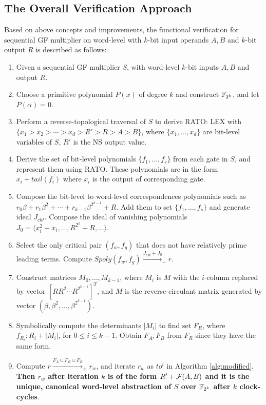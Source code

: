\subsection{The Overall Verification Approach}
Based on above concepts and improvements, the functional verification for sequential GF multiplier 
on word-level with $k$-bit input operands $A,B$ and $k$-bit output $R$ is described as follows:
\begin{enumerate}[{1)}]
\item Given a sequential GF multiplier $S$, with word-level $k$-bit inputs $A,B$ and output $R$.
\item Choose a primitive polynomial $P(x)$ of degree $k$ and construct ${\mathbb{F}}_{2^k}$, and let $P(\alpha)=0$.
\item Perform a reverse-topological traversal of $S$ to derive RATO: LEX with $\{x_1>x_2>\cdots>x_d>R'>R>A>B\}$,
where $\{x_1,\dots,x_d\}$ are bit-level variables of $S$, $R'$ is the NS output value.
\item Derive the set of bit-level polynomials $\{f_1,\dots,f_s\}$ from each gate in $S$, and represent them 
using RATO. These polynomials are in the form $x_i+tail(f_i)$ where $x_i$ is the output of corresponding gate.
\item Compose the bit-level to word-level correspondences polynomials such as $r_0\beta+r_1\beta^2+\cdots+r_{k-1}\beta^{2^{k-1}}+R$.
Add them to set $\{f_1,\dots,f_s\}$ and generate ideal $J_{ckt}$. Compose the ideal of vanishing polynomials
$J_0 = \langle x_i^2+x_i, \dots, R^{2^k}+R,\dots\rangle$.
\item Select the only critical pair $(f_w,f_g)$ that does not have relatively prime leading terms. Compute
$Spoly(f_w,f_g) \xrightarrow{J_{ckt}+J_0}_{+}r$.
\item Construct matrices $M_0,\dots,M_{k-1}$, where $M_i$ is $M$ with the $i$-column replaced by vector 
$[R R^2 \cdots R^{2^{k-1}}]^T$, and $M$ is the reverse-circulant matrix generated by vector $(\beta,\beta^2,\dots,\beta^{2^{k-1}})$.
\item Symbolically compute the determinants $|M_i|$ to find set $F_R$, where $f_{R_i}:R_i+|M_i|$, for $0\leq i \leq k-1$.
Obtain $F_A, F_B$ from $F_R$ since they have the same form.
\item Compute $r \xrightarrow{F_A\cup F_B \cup F_R}_{+}r_w$, and iterate $r_w$ as $to^i$ in Algorithm \ref{alg:modified}.
{\bf Then $r_w$ after iteration $k$ is of the form $R'+{\mathcal{F}}(A,B)$ and it is the unique, canonical word-level abstraction
of $S$ over ${\mathbb{F}}_{2^k}$ after $k$ clock-cycles}.
\end{enumerate}

